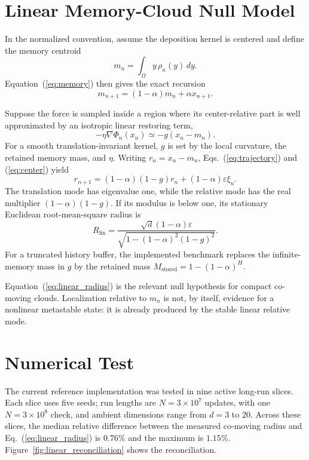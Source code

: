 \documentclass[reprint,amsmath,amssymb,aps,prd,nofootinbib,floatfix]{revtex4-2}
\begin{document}
\section{Linear Memory-Cloud Null Model}

In the normalized convention, assume the deposition kernel is centered and
define the memory centroid
\begin{equation}
m_n=\int_\Omega y\,\rho_n(y)\,dy .
\end{equation}
Equation~(\ref{eq:memory}) then gives the exact recursion
\begin{equation}
m_{n+1}=(1-\alpha)m_n+\alpha x_{n+1}.
\label{eq:center}
\end{equation}

Suppose the force is sampled inside a region where its center-relative part is
well approximated by an isotropic linear restoring term,
\begin{equation}
-\eta\nabla\Phi_n(x_n)\simeq-g(x_n-m_n).
\label{eq:linear_force}
\end{equation}
For a smooth translation-invariant kernel, $g$ is set by the local curvature,
the retained memory mass, and $\eta$.
Writing $r_n=x_n-m_n$, Eqs.~(\ref{eq:trajectory}) and
(\ref{eq:center}) yield
\begin{equation}
r_{n+1}=(1-\alpha)(1-g)r_n
+(1-\alpha)\varepsilon\xi_n .
\label{eq:relative_mode}
\end{equation}
The translation mode has eigenvalue one, while the relative mode has the real
multiplier $(1-\alpha)(1-g)$.
If its modulus is below one, its stationary Euclidean root-mean-square radius
is
\begin{equation}
R_{\mathrm{lin}}
=\frac{\sqrt{d}(1-\alpha)\varepsilon}
{\sqrt{1-(1-\alpha)^2(1-g)^2}}.
\label{eq:linear_radius}
\end{equation}
For a truncated history buffer, the implemented benchmark replaces the
infinite-memory mass in $g$ by the retained mass
$M_{\mathrm{stored}}=1-(1-\alpha)^H$.

Equation~(\ref{eq:linear_radius}) is the relevant null hypothesis for compact
co-moving clouds.
Localization relative to $m_n$ is not, by itself, evidence for a nonlinear
metastable state: it is already produced by the stable linear relative mode.

\section{Numerical Test}

The current reference implementation was tested in nine active long-run
slices.
Each slice uses five seeds; run lengths are $N=3\times10^7$ updates, with one
$N=3\times10^8$ check, and ambient dimensions range from $d=3$ to $20$.
Across these slices, the median relative difference between the measured
co-moving radius and Eq.~(\ref{eq:linear_radius}) is $0.76\%$ and the maximum
is $1.15\%$.
Figure~\ref{fig:linear_reconciliation} shows the reconciliation.
\end{document}
